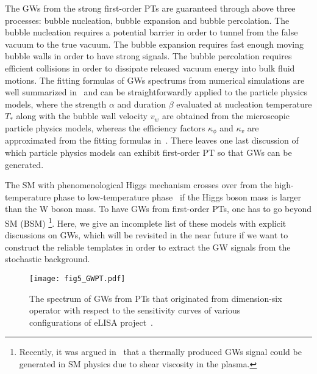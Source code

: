 \documentclass[a4paper,11pt]{article}
\begin{document}
The GWs from the strong first-order PTs are guaranteed through above three processes: bubble nucleation, bubble expansion and bubble percolation. The bubble nucleation requires a potential barrier in order to tunnel from the false vacuum to the true vacuum. The bubble expansion requires fast enough moving bubble walls in order to have strong signals. The bubble percolation requires efficient collisions in order to dissipate released vacuum energy into bulk fluid motions. The fitting formulas of GWs spectrums from numerical simulations are well summarized in~\cite{Caprini:2015zlo} and can be straightforwardly applied to the particle physics models, where the strength $\alpha$ and duration $\beta$ evaluated at nucleation temperature $T_*$ along with the bubble wall velocity $v_w$ are obtained from the microscopic particle physics models, whereas the efficiency factors $\kappa_\phi$ and $\kappa_v$ are approximated from the fitting formulas in~\cite{Espinosa:2010hh}. There leaves one last discussion of which particle physics models can exhibit first-order PT so that GWs can be generated.

The SM with phenomenological Higgs mechanism crosses over from the high-temperature phase to low-temperature phase~\cite{Kajantie:1996mn} if the Higgs boson mass is larger than the W boson mass. To have GWs from first-order PTs, one has to go beyond SM (BSM) \footnote{Recently, it was argued in~\cite{Ghiglieri:2015nfa} that a thermally produced GWs signal could be generated in SM physics due to shear viscosity in the plasma.}. Here, we give an incomplete list of these models with explicit discussions on GWs, which will be revisited in the near future if we want to construct the reliable templates in order to extract the GW signals from the stochastic background.

\begin{figure}
  \centering
  \texttt{[image: fig5\_GWPT.pdf]}
  \caption{The spectrum of GWs from PTs that originated from dimension-six operator with respect to the sensitivity curves of various configurations of eLISA project~\cite{Binetruy:2012ze}.}
  \label{fig:GWPT}
\end{figure}
\end{document}
